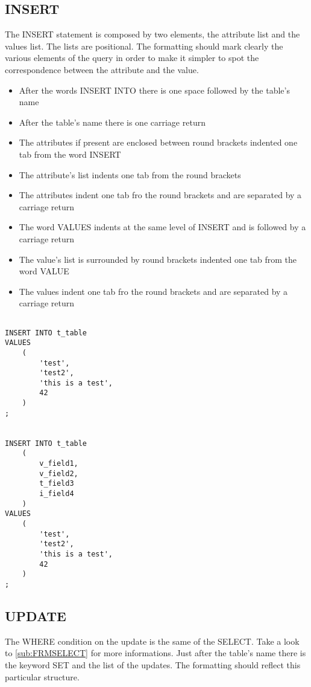 \subsection{INSERT}
The INSERT statement is composed by two elements, the attribute list and the values list. The lists are positional.
The formatting should mark clearly the various elements of the query in order to make it simpler to spot the 
correspondence between the attribute and the value. 

\begin{itemize}
 \item After the words INSERT INTO there is one space followed by the table's name
 \item After the table's name there is one carriage return
 \item The attributes if present are enclosed between round brackets indented one tab from the word INSERT
 \item The attribute's list indents one tab from the round brackets
 \item The attributes indent one tab fro the round brackets and are separated by a carriage return
 \item The word VALUES indents at the same level of INSERT and is followed by a carriage return
 \item The value's list is surrounded by round brackets indented one tab from the  word VALUE
 \item The values indent one tab fro the round brackets and are separated by a carriage return
\end{itemize}
\newpage

\begin{lstlisting}[style=pgsql]

INSERT INTO t_table
VALUES
	(
		'test',
		'test2',
		'this is a test',
		42
	)
;


INSERT INTO t_table
	(
		v_field1,
		v_field2,
		t_field3
		i_field4
	)
VALUES
	(
		'test',
		'test2',
		'this is a test',
		42
	)
;

\end{lstlisting}

\subsection{UPDATE}
The WHERE condition on the update is the same of the SELECT. Take a look to \ref{sub:FRMSELECT} for more 
informations. Just after the table's name there is the keyword SET and the list of the updates. The 
formatting should reflect this particular structure.

